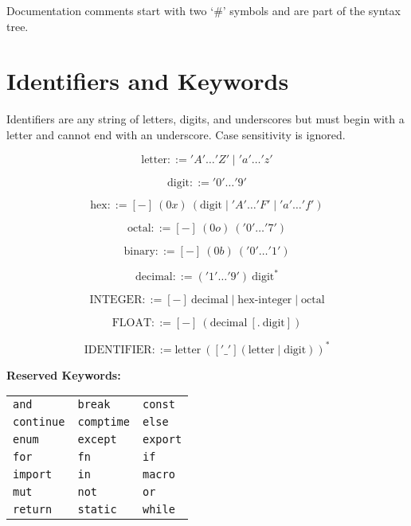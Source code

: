 \documentclass{article}
\begin{document}
Documentation comments start with two `\#' symbols and are part of the syntax tree.

\section{Identifiers and Keywords}
Identifiers are any string of letters, digits, and underscores but must begin with a letter and cannot end with an underscore. Case sensitivity is ignored.





\[
\text{letter} ::= 'A' \dots 'Z' \mid 'a' \dots 'z'
\]

\[
\text{digit} ::= '0' \dots '9'
\]

\[
\text{hex} ::= [-] \ (0x) \ ( \text{digit} \mid 'A' \dots 'F' \mid 'a' \dots 'f' )
\]

\[
\text{octal} ::= [-] \ (0o) \ ( '0' \dots '7' )
\]

\[
\text{binary} ::= [-] \ (0b) \ ( '0' \dots '1' )
\]

\[
\text{decimal} ::= ( '1' \dots '9' ) \ \text{digit}^*
\]

\[
\text{INTEGER} ::= [-] \ \text{decimal} \mid \text{hex-integer} \mid \text{octal}
\]

\[
\text{FLOAT} ::= [-] \ ( \text{decimal} \ [ . \ \text{digit} ] )
\]

\[
\text{IDENTIFIER} ::= \text{letter} \ ( ['\_'] ( \text{letter} \mid \text{digit} ) )^*
\]




\noindent \textbf{Reserved Keywords:}

\vspace{10pt}
\begin{center}
\begin{tabular}{ l l l }
\texttt{and}   & \texttt{break}     & \texttt{const}     \\
\texttt{continue}  & \texttt{comptime} & \texttt{else}      \\
\texttt{enum}   & \texttt{except}   & \texttt{export}   \\
\texttt{for}    & \texttt{fn}        & \texttt{if}        \\
\texttt{import}  & \texttt{in}      & \texttt{macro}    \\
\texttt{mut}    & \texttt{not}      & \texttt{or}       \\
\texttt{return} & \texttt{static}   & \texttt{while}     \\
\end{tabular}
\end{center}
\end{document}
